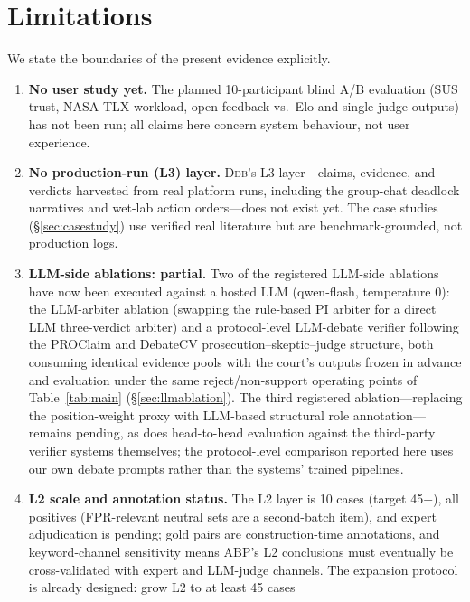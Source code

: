 \documentclass[11pt]{article}
\newcommand{\ddb}{\textsc{Ddb}}
\begin{document}
\section{Limitations}\label{sec:limits}

We state the boundaries of the present evidence explicitly.

\begin{enumerate}[leftmargin=2em,itemsep=2pt]
\item \textbf{No user study yet.} The planned 10-participant blind A/B
evaluation (SUS trust, NASA-TLX workload, open feedback vs.\ Elo and
single-judge outputs) has not been run; all claims here concern system
behaviour, not user experience.
\item \textbf{No production-run (L3) layer.} \ddb{}'s L3 layer—claims,
evidence, and verdicts harvested from real platform runs, including the
group-chat deadlock narratives and wet-lab action orders—does not exist
yet. The case studies (\S\ref{sec:casestudy}) use verified real literature
but are benchmark-grounded, not production logs.
\item \textbf{LLM-side ablations: partial.} Two of the registered LLM-side
ablations have now been executed against a hosted LLM (qwen-flash,
temperature 0): the LLM-arbiter ablation (swapping the rule-based PI
arbiter for a direct LLM three-verdict arbiter) and a protocol-level
LLM-debate verifier following the PROClaim \citep{chowdhury2026proclaim}
and DebateCV \citep{he2026debatecv} prosecution--skeptic--judge structure,
both consuming identical evidence pools with the court's outputs frozen in
advance and evaluation under the same reject/non-support operating points
of Table~\ref{tab:main} (\S\ref{sec:llmablation}). The third registered
ablation—replacing the position-weight proxy with LLM-based structural
role annotation—remains pending, as does head-to-head evaluation against
the third-party verifier systems themselves; the protocol-level comparison
reported here uses our own debate prompts rather than the systems'
trained pipelines.
\item \textbf{L2 scale and annotation status.} The L2 layer is 10 cases
(target 45+), all positives (FPR-relevant neutral sets are a second-batch
item), and expert adjudication is pending; gold pairs are construction-time
annotations, and keyword-channel sensitivity means ABP's L2 conclusions
must eventually be cross-validated with expert and LLM-judge channels. The
expansion protocol is already designed: grow L2 to at least 45 cases

\end{enumerate}
\end{document}
